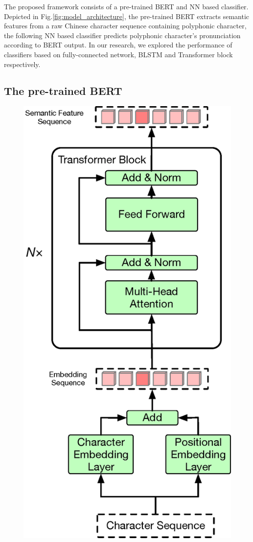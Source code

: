 \documentclass[a4paper]{article}
\begin{document}
The proposed framework consists of a pre-trained BERT and NN based classifier. Depicted in  Fig.\ref{fig:model_architecture}, the pre-trained BERT extracts semantic features from a raw Chinese character sequence containing polyphonic character, the following NN based classifier predicts polyphonic character's pronunciation according to BERT output. In our research, we explored the performance of classifiers based on fully-connected network, BLSTM and Transformer block respectively.


\subsection{The pre-trained BERT}

\begin{figure}[t]
	\centering
	\includegraphics[scale=0.31]{pics3/bert2.eps}

\end{figure}
\end{document}

